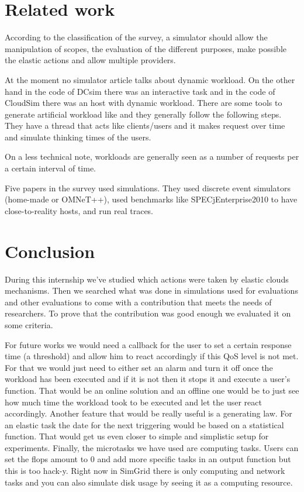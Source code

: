 \documentclass[a4paper, onecolumn]{article}
\begin{document}


\section{Related work} \label{sota}
According to the classification of the survey, a simulator should allow the
manipulation of scopes, the evaluation of the different purposes, make
possible the elastic actions and allow multiple providers.

At the moment no simulator article talks about dynamic workload. On the other
hand in the code of DCsim \cite{tighe2013towards} there was an interactive
task and in the code of CloudSim \cite{calheiros2011cloudsim} there was an
host with dynamic workload. There are some tools to generate artificial
workload like \cite{bodik2010characterizing} and they generally follow the
following steps. They have a thread that acts like clients/users and it makes
request over time and simulate thinking times of the users.

On a less technical note, workloads are generally seen as a number of 
requests per a certain interval of time.

Five papers in the survey used simulations. They used discrete event 
simulators (home-made or OMNeT++), used benchmarks like SPECjEnterprise2010 
to have close-to-reality hosts, and run real traces.
  

\section{Conclusion} \label{conclu}
During this internship we've studied which actions were taken by elastic clouds 
mechanisms. Then we searched what was done in simulations used for evaluations 
and other evaluations to come with a contribution that meets the needs of 
researchers. To prove that the contribution was good enough we evaluated it on 
some criteria.

For future works we would need a callback for the user to set a certain 
response time (a threshold) and allow him to react accordingly if this QoS level
is not met. For that we would just need to either set an alarm and turn it off
once the workload has been executed and if it is not then it stops it and
execute a user's function. That would be an online solution and an offline one
would be to just see how much time the workload took to be executed and let the
user react accordingly. Another feature that would be really useful is a
generating law. For an elastic task the date for the next triggering would be
based on a statistical function. That would get us even closer to simple and
simplistic setup for experiments. Finally, the microtasks we have used are
computing tasks. Users can set the flops amount to 0 and add more specific tasks
in an output function but this is too hack-y. Right now in SimGrid there is only
computing and network tasks and you can also simulate disk usage by seeing it as
a computing resource.
\end{document}
